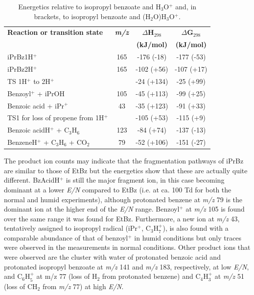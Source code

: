 \begin{table}[htbp]
\centering
\caption{Energetics relative to isopropyl benzoate and H$_3$O$^+$ and, in brackets, to isopropyl benzoate and (H$_2$O)H$_3$O$^+$. }
\label{tb:iprbz2}
\begin{tabular}{lccc}
\toprule
\textbf{Reaction or transition state}	&\textbf{\textit{m/z} } &\textbf{$\Delta$H$_{298}$} &\textbf{$\Delta$G$_{298}$}\\
& &	\textbf{(kJ/mol)} &\textbf{(kJ/mol)} \\  \toprule
iPrBz1H$^+$        & 165 & -176 (-18) & -177 (-53) \\ \midrule
iPrBz2H$^+$        & 165 & -102 (+56) & -107 (+17) \\ \midrule
TS 1H$^+$ to 2H$^+$   &  & -24 (+134) & -25 (+99) \\ \midrule
Benzoyl$^+$ + iPrOH & 105 & -45 (+113) & -99 (+25) \\ \midrule
Benzoic acid + iPr$^+$ & 43 & -35 (+123) & -91 (+33) \\ \midrule
TS1 for loss of propene from 1H$^+$ &  & -105 (+53) & -115 (+9) \\ \midrule
Benzoic acidH$^+$ + C$_3$H$_6$ & 123 & -84 (+74) & -137 (-13) \\ \midrule
BenzeneH$^+$ + C$_3$H$_6$ + CO$_2$ & 79 & -52 (+106) & -151 (-27) \\
\bottomrule
\end{tabular}
\end{table}




The product ion counts may indicate that the fragmentation pathways of iPrBz are similar to those of EtBz but the energetics show that these are actually quite different.
%
BzAcidH$^+$ is still the major fragment ion, in this case becoming dominant at a lower \textit{E/N} compared to EtBz (i.e. at ca. 100 Td for both the normal and humid experiments), although protonated benzene at \textit{m/z} 79 is the dominant ion at the higher end of the \textit{E/N} range.
%
Benzoyl$^+$ at \textit{m/z} 105 is found over the same range it was found for EtBz.
%
Furthermore, a new ion at \textit{m/z} 43, tentatively assigned to isopropyl radical (iPr$^+$, C$_3$H$_7^+$), is also found with a comparable abundance of that of benzoyl$^+$ in  humid conditions but only traces were observed in the measurements in normal conditions.
%
Other product ions that were observed are
the cluster with water of protonated benzoic acid and protonated isopropyl benzoate at \textit{m/z} 141 and \textit{m/z} 183, respectively, at low \textit{E/N}, and C$_6$H$^+_5$ at m/z 77 (loss of H$_2$ from protonated benzene) and  C$_4$H$^+_3$ at \textit{m/z} 51 (loss of CH$_2$ from \textit{m/z} 77) at high \textit{E/N}.


